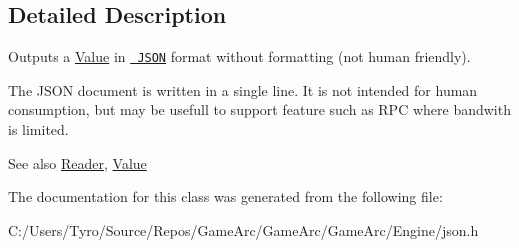 \subsection{Detailed Description}
Outputs a \mbox{\hyperlink{class_json_1_1_value}{Value}} in \href{http://www.json.org}{\texttt{ J\+S\+ON}} format without formatting (not human friendly). 

The J\+S\+ON document is written in a single line. It is not intended for \textquotesingle{}human\textquotesingle{} consumption, but may be usefull to support feature such as R\+PC where bandwith is limited. \begin{DoxySeeAlso}{See also}
\mbox{\hyperlink{class_json_1_1_reader}{Reader}}, \mbox{\hyperlink{class_json_1_1_value}{Value}} 
\end{DoxySeeAlso}


The documentation for this class was generated from the following file\+:\begin{DoxyCompactItemize}
\item 
C\+:/\+Users/\+Tyro/\+Source/\+Repos/\+Game\+Arc/\+Game\+Arc/\+Game\+Arc/\+Engine/json.\+h\end{DoxyCompactItemize}

